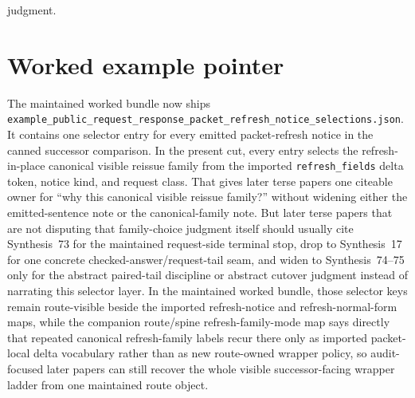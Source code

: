 \documentclass[11pt]{article}
\begin{document}
judgment.\cite{series:publicrequestresponsepackets,series:publicrequestresponsepacketcarryforward,series:publicrequestresponsepacketdeltas,series:publicrequestresponsepacketrefreshnotices,series:publicrequestresponsepacketrefreshnoticenormalforms,series:publicrequestresponsepacketrefreshresponsemenus,series:publicrequestresponsepacketrefreshresponsepackets,series:publicrequestresponsepacketrefreshresponsepacketclosureverdicts,series:pairedterminalcitationdiscipline,series:pairedterminalcutoverrule}

\section{Worked example pointer}
The maintained worked bundle now ships \nolinkurl{example_public_request_response_packet_refresh_notice_selections.json}.\cite{series:workedexample}
It contains one selector entry for every emitted packet-refresh notice in the canned successor comparison. In the present cut, every entry selects the refresh-in-place canonical visible reissue family from the imported \texttt{refresh\_fields} delta token, notice kind, and request class. That gives later terse papers one citeable owner for ``why this canonical visible reissue family?'' without widening either the emitted-sentence note or the canonical-family note. But later terse papers that are not disputing that family-choice judgment itself should usually cite Synthesis~73 for the maintained request-side terminal stop, drop to Synthesis~17 for one concrete checked-answer/request-tail seam, and widen to Synthesis~74--75 only for the abstract paired-tail discipline or abstract cutover judgment instead of narrating this selector layer. In the maintained worked bundle, those selector keys remain route-visible beside the imported refresh-notice and refresh-normal-form maps, while the companion route/spine refresh-family-mode map says directly that repeated canonical refresh-family labels recur there only as imported packet-local delta vocabulary rather than as new route-owned wrapper policy, so audit-focused later papers can still recover the whole visible successor-facing wrapper ladder from one maintained route object.
\end{document}
